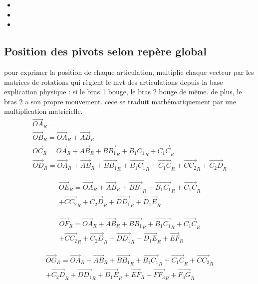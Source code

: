 \documentclass[12pt,a4paper]{article}
\begin{document}
\begin{itemize}
	\item
	\item 
	\item 
\end{itemize}


\medbreak

\medbreak

\medbreak

\medbreak


\subsection{Position des pivots selon repère global}
pour exprimer la position de chaque articulation, multiplie chaque vecteur par les matrices de rotations qui règlent le mvt des articulations depuis la base
\medbreak
explication physique : si le bras 1 bouge, le bras 2 bouge de même. de plus, le bras 2 a son propre mouvement. cece se traduit mathématiquement par une multiplication matricielle.  
\begin{eqnarray}
\vec{OA}_R=\\
\vec{OB}_R=\vec{OA}_R+\vec{AB}_R\\
\vec{OC}_R=\vec{OA}_R+\vec{AB}_R+\vec{B B_1}_R+\vec{B_1 C_1}_R+\vec{C_1 C}_R\\
\vec{OD}_R=\vec{OA}_R+\vec{AB}_R+\vec{B B_1}_R+\vec{B_1 C_1}_R+\vec{C_1 C}_R+\vec{C C_2}_R+\vec{C_2 D}_R
\end{eqnarray}

\begin{equation}
\begin{split}
\vec{OE}_R=\vec{OA}_R+\vec{AB}_R+\vec{B B_1}_R+\vec{B_1 C_1}_R+\vec{C_1 C}_R\\+\vec{C C_2}_R+\vec{C_2 D}_R+\vec{D D_1}_R+\vec{D_1 E}_R
\end{split}
\end{equation}

\begin{equation}
\begin{split}
\vec{OF}_R=\vec{OA}_R+\vec{AB}_R+\vec{B B_1}_R+\vec{B_1 C_1}_R+\vec{C_1 C}_R\\+\vec{C C_2}_R+\vec{C_2 D}_R+\vec{D D_1}_R+\vec{D_1 E}_R+\vec{E F}_R
\end{split}
\end{equation}

\begin{equation}
\begin{split}
\vec{OG}_R=\vec{OA}_R+\vec{AB}_R+\vec{B B_1}_R+\vec{B_1 C_1}_R+\vec{C_1 C}_R+\vec{C C_2}_R\\+\vec{C_2 D}_R+\vec{D D_1}_R+\vec{D_1 E}_R+\vec{E F}_R+\vec{F F_3}_R+\vec{F_3 G}_R
\end{split}
\end{equation}
\end{document}
